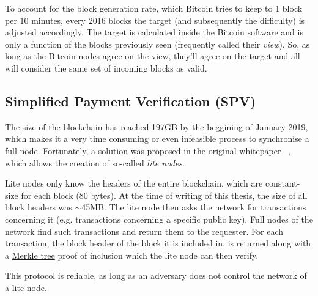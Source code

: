 To account for the block generation rate, which Bitcoin tries to keep to 1 block per 10 minutes, every 2016 blocks the target (and subsequently the difficulty) is adjusted accordingly. The target is calculated inside the Bitcoin software and is only a function of the blocks previously seen (frequently called their \emph{view}). So, as long as the Bitcoin nodes agree on the view, they'll agree on the target and all will consider the same set of incoming blocks as valid.


\subsection{Simplified Payment Verification (SPV)}
The size of the blockchain has reached 197GB by the beggining of January 2019, which makes it a very time consuming or even infeasible process to synchronise a full node. Fortunately, a solution was proposed in the original whitepaper ~\cite{Nakamoto_bitcoin:a}, which allows the creation of so-called \emph{lite nodes}.

Lite nodes only know the headers of the entire blockchain, which are constant-size for each block (80 bytes). At the time of writing of this thesis, the size of all block headers was $\sim$45MB. The lite node then asks the network for transactions concerning it (e.g. transactions concerning a specific public key). Full nodes of the network find such transactions and return them to the requester. For each transaction, the block header of the block it is included in, is returned along with a \hyperref[sec:merkle-trees]{Merkle tree} proof of inclusion which the lite node can then verify.

This protocol is reliable, as long as an adversary does not control the network of a lite node.


